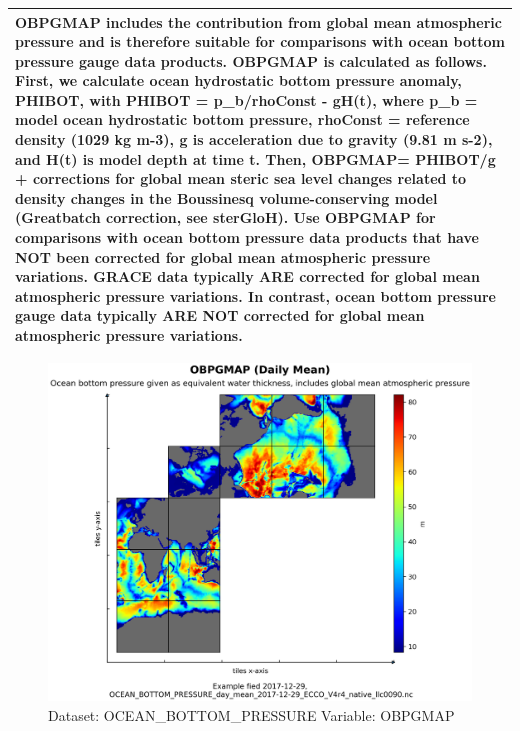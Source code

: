 \begin{longtable}{|p{}|p{}|p{}|p{}|}
\multicolumn{4}{|p{1\textwidth}|}{OBPGMAP includes the contribution from global mean atmospheric pressure and is therefore suitable for comparisons with ocean bottom pressure gauge data products. OBPGMAP is calculated as follows. First, we calculate ocean hydrostatic bottom pressure anomaly, PHIBOT, with PHIBOT = p\_b/rhoConst - gH(t), where p\_b = model ocean hydrostatic bottom pressure, rhoConst = reference density (1029 kg m-3), g is acceleration due to gravity (9.81 m s-2), and H(t) is model depth at time t. Then, OBPGMAP= PHIBOT/g + corrections for global mean steric sea level changes related to density changes in the Boussinesq volume-conserving model (Greatbatch correction, see sterGloH). Use OBPGMAP for comparisons with ocean bottom pressure data products that have NOT been corrected for global mean atmospheric pressure variations. GRACE data typically ARE corrected for global mean atmospheric pressure variations. In contrast, ocean bottom pressure gauge data typically ARE NOT corrected for global mean atmospheric pressure variations.} \\ \hline
\end{longtable}

\begin{figure}[H]
\centering
\includegraphics[width=\textwidth]{../images/plots/native_plots/Ocean_Bottom_Pressure/OBPGMAP.png}
\caption{Dataset: OCEAN\_BOTTOM\_PRESSURE Variable: OBPGMAP}
\label{tab:table-OCEAN_BOTTOM_PRESSURE_OBPGMAP-Plot}
\end{figure}
\pagebreak
